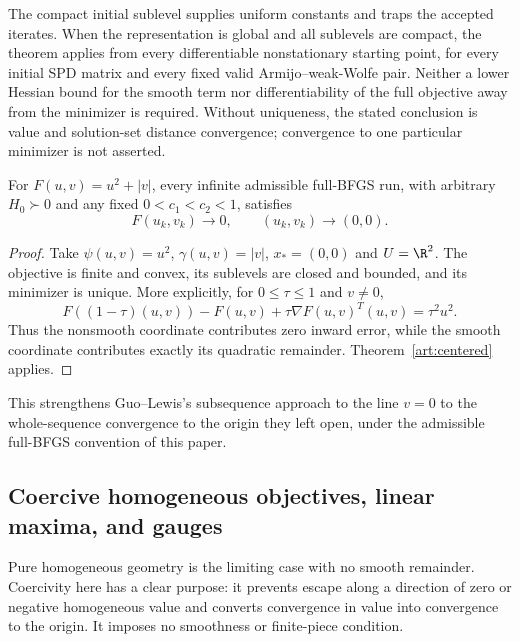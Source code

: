 The compact initial sublevel supplies uniform constants and traps the accepted
iterates. When the representation is global and all sublevels are compact,
the theorem applies from every differentiable nonstationary starting point,
for every initial SPD matrix and every fixed valid Armijo--weak-Wolfe pair.
Neither a lower Hessian bound for the smooth term nor differentiability of
the full objective away from the minimizer is required. Without uniqueness,
the stated conclusion is value and solution-set distance convergence;
convergence to one particular minimizer is not asserted.

\begin{corollary}\label{art:mixed-benchmark}
For $F(u,v)=u^2+|v|$, every infinite admissible full-BFGS run, with arbitrary
$H_0\succ0$ and any fixed $0<c_1<c_2<1$, satisfies
\[
 F(u_k,v_k)\longrightarrow0,\qquad (u_k,v_k)\longrightarrow(0,0).
\]
\end{corollary}
\begin{proof}
Take $\psi(u,v)=u^2$, $\gamma(u,v)=|v|$, $x_*=(0,0)$ and $U=\R^2$.
The objective is finite and convex, its sublevels are closed and bounded,
and its minimizer is unique. More explicitly, for $0\le\tau\le1$ and
$v\ne0$,
\[
 F((1-\tau)(u,v))-F(u,v)
       +\tau\nabla F(u,v)^T(u,v)=\tau^2u^2.
\]
Thus the nonsmooth coordinate contributes zero inward error, while the
smooth coordinate contributes exactly its quadratic remainder.
Theorem~\ref{art:centered} applies.
\end{proof}

This strengthens Guo--Lewis's subsequence approach to the line $v=0$
\cite[Corollary~4.4]{GL18} to the whole-sequence convergence to the origin
they left open, under the admissible full-BFGS convention of this paper.

\subsection{Coercive homogeneous objectives, linear maxima, and gauges}

Pure homogeneous geometry is the limiting case with no smooth remainder.
Coercivity here has a clear purpose: it prevents escape along a direction of
zero or negative homogeneous value and converts convergence in value into
convergence to the origin. It imposes no smoothness or finite-piece condition.

